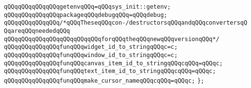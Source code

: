 \verb|qQQqqQQqqQQqqQQqgetenvqQQq=qQQqsys_init::getenv;|\newline
\newline
\verb|qQQqqQQqqQQqqQQqpackageqQQqdebugqQQq=qQQqdebug;|\newline
\newline
\verb|qQQqqQQqqQQqqQQq/*qQQqTheseqQQqcon-/destructorsqQQqandqQQqconvertersqQQqareqQQqneededqQQq|\newline
\verb|qQQqqQQqqQQqqQQqqQQqqQQqqQQqforqQQqtheqQQqnewqQQqversionqQQq*/|\newline
\newline
\verb|qQQqqQQqqQQqqQQqfunqQQqwidget_id_to_stringqQQqc=c;|\newline
\verb|qQQqqQQqqQQqqQQqfunqQQqwindow_id_to_stringqQQqc=c;|\newline
\verb|qQQqqQQqqQQqqQQqfunqQQqcanvas_item_id_to_stringqQQqcqQQq=qQQqc;|\newline
\verb|qQQqqQQqqQQqqQQqfunqQQqtext_item_id_to_stringqQQqcqQQq=qQQqc;|\newline
\newline
\verb|qQQqqQQqqQQqqQQqfunqQQqmake_cursor_nameqQQqcqQQq=qQQqc;|\newline
\newline
\verb|};|\newline
\newline
\newline
\newline

